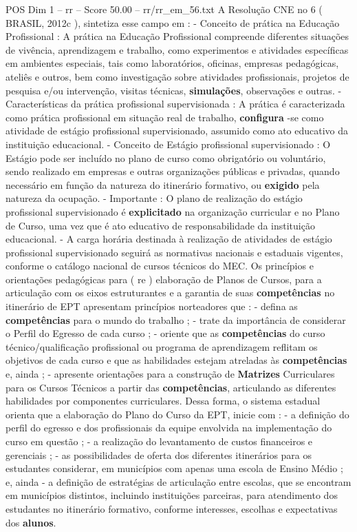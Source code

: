 \begin{textsample}{POS Dim 1 – rr – Score 50.00 – rr/rr\_em\_56.txt}
A Resolução CNE no 6 ( BRASIL, 2012c ), sintetiza esse campo em : - Conceito de prática na Educação Profissional : A prática na Educação Profissional compreende diferentes situações de vivência, aprendizagem e trabalho, como experimentos e atividades específicas em ambientes especiais, tais como laboratórios, oficinas, empresas pedagógicas, ateliês e outros, bem como investigação sobre atividades profissionais, projetos de pesquisa e/ou intervenção, visitas técnicas, \textbf{simulações}, observações e outras. - Características da prática profissional supervisionada : A prática é caracterizada como prática profissional em situação real de trabalho, \textbf{configura} -se como atividade de estágio profissional supervisionado, assumido como ato educativo da instituição educacional. - Conceito de Estágio profissional supervisionado : O Estágio pode ser incluído no plano de curso como obrigatório ou voluntário, sendo realizado em empresas e outras organizações públicas e privadas, quando necessário em função da natureza do itinerário formativo, ou \textbf{exigido} pela natureza da ocupação. - Importante : O plano de realização do estágio profissional supervisionado é \textbf{explicitado} na organização curricular e no Plano de Curso, uma vez que é ato educativo de responsabilidade da instituição educacional. - A carga horária destinada à realização de atividades de estágio profissional supervisionado seguirá as normativas nacionais e estaduais vigentes, conforme o catálogo nacional de cursos técnicos do MEC.
Os princípios e orientações pedagógicas para ( re ) elaboração de Planos de Cursos, para a articulação com os eixos estruturantes e a garantia de suas \textbf{competências} no itinerário de EPT apresentam princípios norteadores que : - defina as \textbf{competências} para o mundo do trabalho ; - trate da importância de considerar o Perfil do Egresso de cada curso ; - oriente que as \textbf{competências} do curso técnico/qualificação profissional ou programa de aprendizagem reflitam os objetivos de cada curso e que as habilidades estejam atreladas às \textbf{competências} e, ainda ; - apresente orientações para a construção de \textbf{Matrizes} Curriculares para os Cursos Técnicos a partir das \textbf{competências}, articulando as diferentes habilidades por componentes curriculares.
Dessa forma, o sistema estadual orienta que a elaboração do Plano do Curso da EPT, inicie com : - a definição do perfil do egresso e dos profissionais da equipe envolvida na implementação do curso em questão ; - a realização do levantamento de custos financeiros e gerenciais ; - as possibilidades de oferta dos diferentes itinerários para os estudantes considerar, em municípios com apenas uma escola de Ensino Médio ; e, ainda - a definição de estratégias de articulação entre escolas, que se encontram em municípios distintos, incluindo instituições parceiras, para atendimento dos estudantes no itinerário formativo, conforme interesses, escolhas e expectativas dos \textbf{alunos}.

\end{textsample}
